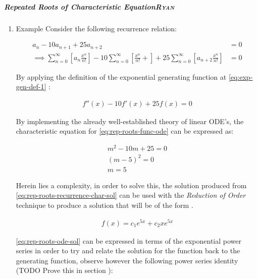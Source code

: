 \documentclass[11pt]{article}
\begin{document}
\subparagraph{Repeated Roots of Characteristic Equation\hfill{}\textsc{Ryan}}
\label{rep-roots-recurrence}
\begin{enumerate}
\item Example
\label{sec:org0594faa}
Consider the following recurrence relation:

\begin{align}
    a_n -  10a_{n+ 1} +  25a_{n+  2}&= 0 \label{eq:hom-repeated-roots-recurrence} \\
    \implies  \sum^{\infty}_{n= 0}   {\left[{ a_n \frac{x^n}{n!} }\right]} - 10 \sum^{\infty}_{n= 0}   {\left[{ \frac{x^n}{n!}+    }\right]} + 25 \sum^{\infty}_{n= 0 }   {\left[{  a_{n+  2 }\frac{x^n}{n!} }\right]}&= 0 \nonumber
\end{align}

By applying the definition of the exponential generating function at \eqref{eq:exp-gen-def-1} :

\begin{align}
    f''{\left({ x }\right)}- 10f'{\left({ x }\right)}+  25f{\left({ x }\right)}= 0 \nonumber \label{eq:rep-roots-func-ode}
\end{align}

By implementing the already well-established theory of linear ODE's, the
characteristic equation for \eqref{eq:rep-roots-func-ode} can be expressed as:

\begin{align}
    m^2- 10m+  25 = 0 \nonumber \\
    {\left({ m- 5 }\right)}^2 = 0 \nonumber \\
    m= 5 \label{eq:rep-roots-recurrence-char-sol}
\end{align}

Herein lies a complexity, in order to solve this, the solution produced from \eqref{eq:rep-roots-recurrence-char-sol} can be used with the \emph{Reduction of Order} technique to produce a solution that will be of the form \cite[]{zillMatrixExponential2009}.

\begin{align}
    f{\left({ x }\right)}= c_1e^{5x} +  c_2 x e^{5x} \label{eq:rep-roots-ode-sol}
\end{align}

\eqref{eq:rep-roots-ode-sol} can be expressed in terms of the exponential power series in order to try and relate the solution for the function back to the generating function,
observe however the following power series identity (TODO Prove this in section ):


\end{enumerate}
\end{document}
